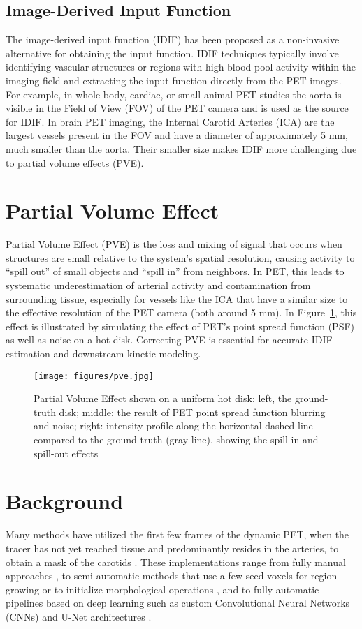 \subsection{Image-Derived Input Function}
The image-derived input function (IDIF) has been proposed as a non-invasive alternative for obtaining the input function. %
IDIF techniques typically involve identifying vascular structures or regions with high blood pool activity within the imaging field and extracting the input function directly from the PET images.
For example, in whole-body, cardiac, or small-animal PET studies the aorta is visible in the Field of View (FOV) of the PET camera and is used as the source for IDIF. %
In brain PET imaging, the Internal Carotid Arteries (ICA) are the largest vessels present in the FOV and have a diameter of approximately 5 mm, much smaller than the aorta. %
Their smaller size makes IDIF more challenging due to partial volume effects (PVE). %

\section{Partial Volume Effect}\label{sec:pve} %
Partial Volume Effect (PVE) is the loss and mixing of signal that occurs when structures are small relative to the system’s spatial resolution, causing activity to “spill out” of small objects and “spill in” from neighbors.
In PET, this leads to systematic underestimation of arterial activity and contamination from surrounding tissue, especially for vessels like the ICA that have a similar size to the effective resolution of the PET camera (both around 5 mm). %
In Figure~\ref{fig:pve}, this effect is illustrated by simulating the effect of PET's point spread function (PSF) as well as noise on a hot disk. %
Correcting PVE is essential for accurate IDIF estimation and downstream kinetic modeling.

\begin{figure}[h]
	\texttt{[image: figures/pve.jpg]}
	\caption{Partial Volume Effect shown on a uniform hot disk: left, the ground-truth disk; middle: the result of PET point spread function blurring and noise; right: intensity profile along the horizontal dashed-line compared to the ground truth (gray line), showing the spill-in and spill-out effects}
	\label{fig:pve}
\end{figure}
\section{Background}
Many methods have utilized the first few frames of the dynamic PET, when the tracer has not yet reached tissue and predominantly resides in the arteries, to obtain a mask of the carotids \cite{young2023image}.
These implementations range from fully manual approaches \cite{feng2015image}, to semi-automatic methods that use a few seed voxels for region growing or to initialize morphological operations \cite{dassanayake2022caliper,vestergaard2021validation}, and to fully automatic pipelines based on deep learning such as custom Convolutional Neural Networks (CNNs) \cite{ferrante2024physically,chen2025deep} and U-Net architectures \cite{chavan2024end}.

